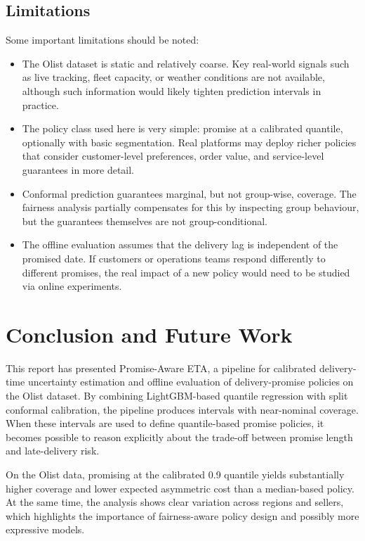 \documentclass[12pt]{article}
\begin{document}
\subsection{Limitations}
Some important limitations should be noted:
\begin{itemize}
  \item The Olist dataset is static and relatively coarse. Key real-world signals such as live tracking, fleet capacity, or weather conditions are not available, although such information would likely tighten prediction intervals in practice.
  \item The policy class used here is very simple: promise at a calibrated quantile, optionally with basic segmentation. Real platforms may deploy richer policies that consider customer-level preferences, order value, and service-level guarantees in more detail.
  \item Conformal prediction guarantees marginal, but not group-wise, coverage. The fairness analysis partially compensates for this by inspecting group behaviour, but the guarantees themselves are not group-conditional.
  \item The offline evaluation assumes that the delivery lag is independent of the promised date. If customers or operations teams respond differently to different promises, the real impact of a new policy would need to be studied via online experiments.
\end{itemize}

\section{Conclusion and Future Work}
This report has presented Promise-Aware ETA, a pipeline for calibrated delivery-time uncertainty estimation and offline evaluation of delivery-promise policies on the Olist dataset. By combining LightGBM-based quantile regression with split conformal calibration, the pipeline produces intervals with near-nominal coverage. When these intervals are used to define quantile-based promise policies, it becomes possible to reason explicitly about the trade-off between promise length and late-delivery risk.

On the Olist data, promising at the calibrated 0.9 quantile yields substantially higher coverage and lower expected asymmetric cost than a median-based policy. At the same time, the analysis shows clear variation across regions and sellers, which highlights the importance of fairness-aware policy design and possibly more expressive models.
\end{document}
